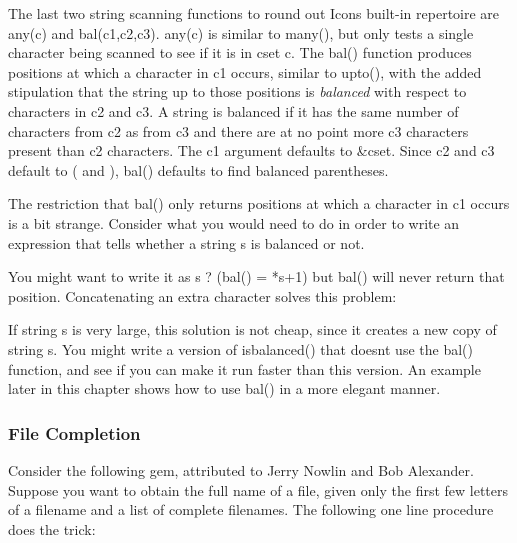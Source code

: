 The last two string scanning functions to round out
Icon{\textquotesingle}s built-in repertoire are
\textsf{any(c)} and \textsf{bal(c1,c2,c3)}.
\textsf{any(c)} is similar to \textsf{many()}, but only tests a single
character being scanned to see if it is in cset \textsf{c}. The
\textsf{bal()} function produces positions at which a character in
\textsf{c1} occurs, similar to \textsf{upto()}, with the added
stipulation that the string up to those positions is \textit{balanced}
with respect to characters in \textsf{c2} and \textsf{c3}. A string is
balanced if it has the same number of characters from \textsf{c2} as
from \textsf{c3} and there are at no point more \textsf{c3} characters
present than \textsf{c2} characters. The \textsf{c1} argument defaults
to \textsf{\&cset}. Since \textsf{c2} and \textsf{c3} default to
\textsf{{\textquotesingle}({\textquotesingle}} and
\textsf{{\textquotesingle}){\textquotesingle}}, \textsf{bal()} defaults
to find balanced parentheses.

The restriction that \textsf{bal()} only returns positions at which a
character in \textsf{c1} occurs is a bit strange. Consider what you
would need to do in order to write an expression that tells whether a
string \textsf{s} is balanced or not.

You might want to write it as \textsf{s ? (bal() = *s+1)} but
\textsf{bal()} will never return that position. Concatenating an extra
character solves this problem:


If string \textsf{s} is very large, this solution is not cheap, since it
creates a new copy of string \textsf{s}. You might write a version of
\textsf{isbalanced()} that doesn{\textquotesingle}t use the
\textsf{bal()} function, and see if you can make it run faster than
this version. An example later in this chapter shows how to use
\textsf{bal()} in a more elegant manner.

\subsubsection{File Completion}

Consider the following gem, attributed to Jerry Nowlin and Bob Alexander. Suppose you want
to obtain the full name of a file, given only the first few letters of
a filename and a list of complete filenames.
The following one line procedure does the trick:


